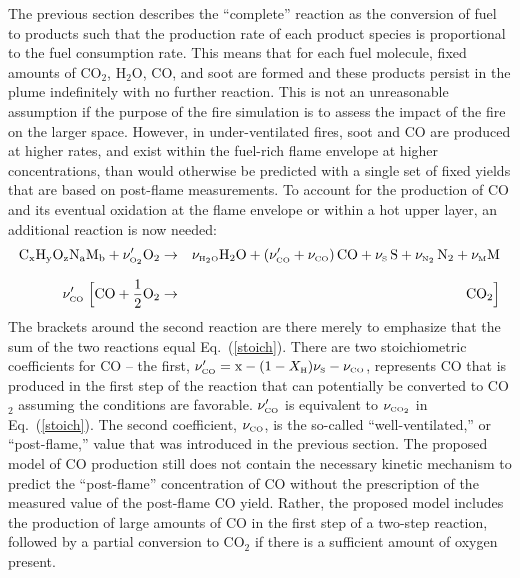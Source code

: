 \documentclass[11pt]{book}
\begin{document}
The previous section describes the ``complete'' reaction as the conversion of fuel to
products such that the production rate of each product species is proportional to the fuel consumption rate.
This means that for each fuel molecule, fixed amounts of CO$_2$, H$_2$O, CO, and soot are formed and these products
persist in the plume indefinitely with no further reaction. This is not an unreasonable assumption if
the purpose of the fire simulation is to assess the impact of the fire on the larger space.
However, in under-ventilated fires, soot and CO are produced at higher rates,
and exist within the fuel-rich flame envelope at higher concentrations,
than would otherwise be predicted with a single set of fixed yields that are based on post-flame measurements. To account for the
production of CO and its eventual oxidation at the flame envelope or within a hot upper layer,
an additional reaction is now needed:
\begin{eqnarray}
\mathrm{C_xH_yO_zN_aM_b} +  \nu_{\tiny \hbox{O}_2}' \mathrm{O_2}  &\rightarrow&  \nu_{\tiny \hbox{H}_2\hbox{O}} \mathrm{H_2O} + (\nu_{\tiny \hbox{CO}}'+ \nu_{\tiny \hbox{CO}}) \, \mathrm{CO} +
     \nu_{\tiny \hbox{S}} \, \mathrm{S}  + \nu_{\tiny \hbox{N}_2} \, \mathrm{N_2} + \nu_{\tiny \hbox{M}} \mathrm{M}  \\*[.1in]
\nu_{\tiny \hbox{CO}}' \; \Big[ \mathrm{CO} + \frac{1}{2} \mathrm{O_2}  &\rightarrow&  \mathrm{CO_2}  \Big]
\label{3reac} \end{eqnarray}
The brackets around the second reaction are there merely to emphasize that the sum of the two reactions equal Eq.~(\ref{stoich}).
There are two stoichiometric coefficients for CO -- the first, $\nu_{\tiny \hbox{CO}}'=\hbox{x}-(1-X_{\tiny \hbox{H}}) \nu_{\tiny \hbox{S}}-\nu_{\tiny \hbox{CO}}$,
represents CO that is produced in the first
step of the reaction that can potentially be converted to CO$_2$ assuming the conditions are favorable. $\nu_{\tiny \hbox{CO}}'$ is equivalent to $\nu_{\tiny \hbox{CO}_2}$ in
Eq.~(\ref{stoich}). The second coefficient, $\nu_{\tiny \hbox{CO}}$,
is the so-called ``well-ventilated,'' or ``post-flame,'' value that was introduced in the previous section. The proposed model of CO production
still does not contain the necessary kinetic mechanism to predict the ``post-flame'' concentration of CO without the prescription of the
measured value of the post-flame CO yield. Rather, the proposed model includes the production of large amounts of CO in the first step of a two-step
reaction, followed by a partial conversion to CO$_2$ if there is a sufficient amount of oxygen present.
\end{document}
